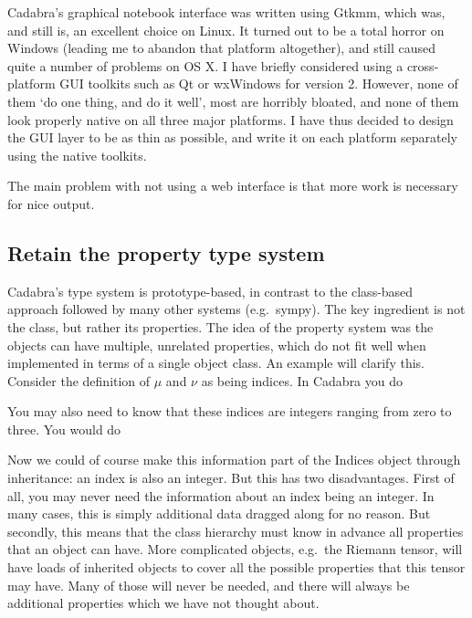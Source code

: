 \documentclass[11pt]{article}
\begin{document}
Cadabra's graphical notebook interface was written using Gtkmm, which
was, and still is, an excellent choice on Linux. It turned out to be a
total horror on Windows (leading me to abandon that platform
altogether), and still caused quite a number of problems on OS X.  I
have briefly considered using a cross-platform GUI toolkits such as Qt
or wxWindows for version 2. However, none of them `do one thing, and
do it well', most are horribly bloated, and none of them look properly
native on all three major platforms. I have thus decided to design the
GUI layer to be as thin as possible, and write it on each platform
separately using the native toolkits.

The main problem with not using a web interface is that more work is
necessary for nice output. 

\subsection{Retain the property type system}

Cadabra's type system is prototype-based, in contrast to the
class-based approach followed by many other systems (e.g.~sympy). 
The key ingredient is not the class, but rather its properties.
The idea of the property system was the objects can have multiple,
unrelated properties, which do not fit well when implemented in terms
of a single object class. An example will clarify this. Consider the
definition of $\mu$ and $\nu$ as being indices. In Cadabra you do
\begin{quote}
\end{quote}
You may also need to know that these indices are integers ranging from
zero to three. You would do
\begin{quote}
\end{quote}
Now we could of course make this information part of the Indices
object through inheritance: an index is also an integer. But this has
two disadvantages. First of all, you may never need the information
about an index being an integer. In many cases, this is simply
additional data dragged along for no reason. But secondly, this means
that the class hierarchy must know in advance all properties that an
object can have. More complicated objects, e.g.~the Riemann tensor,
will have loads of inherited objects to cover all the possible
properties that this tensor may have. Many of those will never be
needed, and there will always be additional properties which we have
not thought about. 
\end{document}
